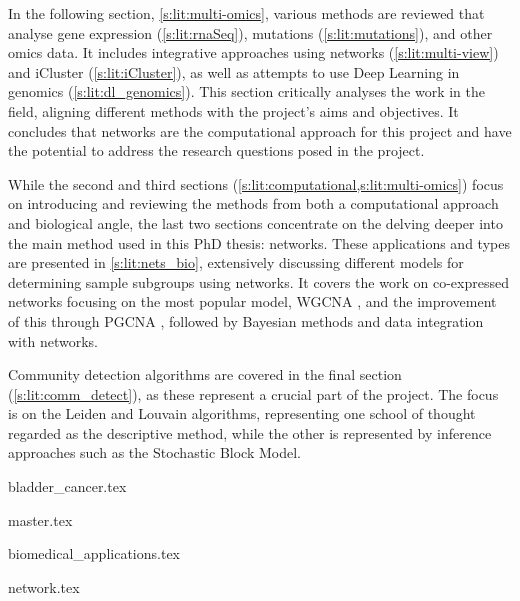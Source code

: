In the following section, \ref{s:lit:multi-omics}, various methods are reviewed that analyse gene expression (\cref{s:lit:rnaSeq}), mutations (\cref{s:lit:mutations}), and other omics data. It includes integrative approaches using networks (\cref{s:lit:multi-view}) and iCluster (\cref{s:lit:iCluster}), as well as attempts to use Deep Learning in genomics (\cref{s:lit:dl_genomics}). This section critically analyses the work in the field, aligning different methods with the project's aims and objectives. It concludes that networks are the computational approach for this project and have the potential to address the research questions posed in the project.

While the second and third sections  (\cref{s:lit:computational,s:lit:multi-omics}) focus on introducing and reviewing the methods from both a computational approach and biological angle, the last two sections concentrate on the delving deeper into the main method used in this PhD thesis: networks. These applications and types are presented in \cref{s:lit:nets_bio}, extensively discussing different models for determining sample subgroups using networks. It covers the work on co-expressed networks focusing on the most popular model, WGCNA \citep{Langfelder2008-sn}, and the improvement of this through PGCNA \citep{Care2019-ij}, followed by Bayesian methods and data integration with networks.

Community detection algorithms are covered in the final section (\cref{s:lit:comm_detect}), as these represent a crucial part of the project. The focus is on the Leiden and Louvain algorithms, representing one school of thought regarded as the descriptive method, while the other is represented by inference approaches such as the Stochastic Block Model.



{bladder_cancer.tex}

\pagebreak

{master.tex}

\newpage

{biomedical_applications.tex}


\pagebreak

{network.tex}



